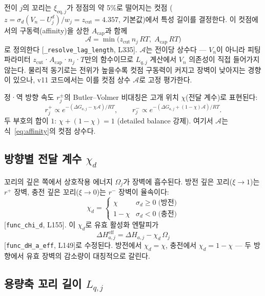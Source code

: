 \documentclass[11pt,a4paper]{article}
\newcommand{\eff}{\mathrm{eff}}
\newcommand{\eq}{\mathrm{eq}}
\begin{document}
전이 $j$의 꼬리는 $\xi_{\eq,j}$가 정점의 약 5\%로 떨어지는 컷점
($z = \sigma_d(V_n-U_j^d)/w_j = z_{\mathrm{cut}} = 4.357$, 기본값)에서 특성 길이를 결정한다.
이 컷점에서의 구동력(affinity)을 상한 $A_{\mathrm{cap}}$과 함께
\begin{equation}
  \mathcal{A} = \min\!\big(z_{\mathrm{cut}}\,n_j\,RT,\; A_{\mathrm{cap}}\,RT\big)
  \label{eq:affinity}
\end{equation}
로 정의한다 [\texttt{\_resolve\_lag\_length}, L335]. $\mathcal{A}$는 전이당 상수다 —
$V_n$이 아니라 피팅 파라미터 $z_{\mathrm{cut}}$·$A_{\mathrm{cap}}$·$n_j$·$T$만의 함수이므로
$L_{q,j}$ 계산에서 $V_n$ 의존성이 직접 들어가지 않는다.
물리적 동기로는 전위가 높을수록 컷점 구동력이 커지고 장벽이 낮아지는 경향이 있으나,
v11 코드에서는 이를 컷점 상수 $\mathcal{A}$로 고정 평가한다.

정·역 방향 속도 $r_j^\pm$의 Butler--Volmer 비대칭은
고개 위치 $\chi$(전달 계수)로 표현된다:
\begin{equation}
  r_j^+ \propto e^{-(\Delta G_{a,j}-\chi\mathcal{A})/RT},\qquad
  r_j^- \propto e^{-(\Delta G_{a,j}+(1-\chi)\mathcal{A})/RT}.
  \label{eq:bv}
\end{equation}
두 부호의 합이 $1$: $\chi + (1-\chi) = 1$ (detailed balance 강제).
여기서 $\mathcal{A}$는 식~\eqref{eq:affinity}의 컷점 상수다.

\subsection{방향별 전달 계수 $\chi_d$}

꼬리의 깊은 쪽에서 상호작용 에너지 $\Omega_j$가 장벽에 흡수된다.
방전 깊은 꼬리($\xi\to1$)는 $r^+$ 장벽, 충전 깊은 꼬리($\xi\to0$)는 $r^-$ 장벽이 율속이다:
\begin{equation}
  \chi_d = \begin{cases} \chi & \sigma_d \ge 0 \;\text{(방전)}\\ 1-\chi & \sigma_d < 0 \;\text{(충전)}\end{cases}
  \label{eq:chid}
\end{equation}
[\texttt{func\_chi\_d}, L155]. 이 $\chi_d$로 유효 활성화 엔탈피가
\begin{equation}
  \Delta H_{a,j}^{\eff} = \Delta H_{a,j} - \chi_d\,\Omega_j
  \label{eq:dHeff}
\end{equation}
[\texttt{func\_dH\_a\_eff}, L149]로 수정된다. 방전에서 $\chi_d=\chi$,
충전에서 $\chi_d=1-\chi$ — 두 방향에서 유효 장벽의 감소량이 대칭적으로 갈린다.

\subsection{용량축 꼬리 길이 $L_{q,j}$}
\end{document}
